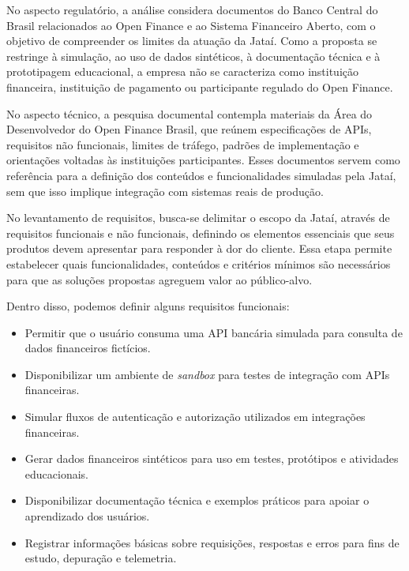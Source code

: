 \documentclass[
  12pt,
  openright,
  oneside,
  a4paper,
  brazilian
]{abntex2}
\begin{document}
No aspecto regulatório, a análise considera documentos do Banco Central do Brasil relacionados ao Open Finance e ao Sistema Financeiro Aberto, com o objetivo de compreender os limites da atuação da Jataí. Como a proposta se restringe à simulação, ao uso de dados sintéticos, à documentação técnica e à prototipagem educacional, a empresa não se caracteriza como instituição financeira, instituição de pagamento ou participante regulado do Open Finance.

No aspecto técnico, a pesquisa documental contempla materiais da Área do Desenvolvedor do Open Finance Brasil, que reúnem especificações de APIs, requisitos não funcionais, limites de tráfego, padrões de implementação e orientações voltadas às instituições participantes. Esses documentos servem como referência para a definição dos conteúdos e funcionalidades simuladas pela Jataí, sem que isso implique integração com sistemas reais de produção.


No levantamento de requisitos, busca-se delimitar o escopo da Jataí, através de requisitos funcionais e não funcionais, definindo os elementos essenciais que seus produtos devem apresentar para responder à dor do cliente. Essa etapa permite estabelecer quais funcionalidades, conteúdos e critérios mínimos são necessários para que as soluções propostas agreguem valor ao público-alvo.

Dentro disso, podemos definir alguns requisitos funcionais:

\begin{itemize}
  \item Permitir que o usuário consuma uma API bancária simulada para consulta de dados financeiros fictícios.

  \item Disponibilizar um ambiente de \textit{sandbox} para testes de integração com APIs financeiras.

  \item Simular fluxos de autenticação e autorização utilizados em integrações financeiras.

  \item Gerar dados financeiros sintéticos para uso em testes, protótipos e atividades educacionais.

  \item Disponibilizar documentação técnica e exemplos práticos para apoiar o aprendizado dos usuários.

  \item Registrar informações básicas sobre requisições, respostas e erros para fins de estudo, depuração e telemetria.
\end{itemize}
\end{document}
